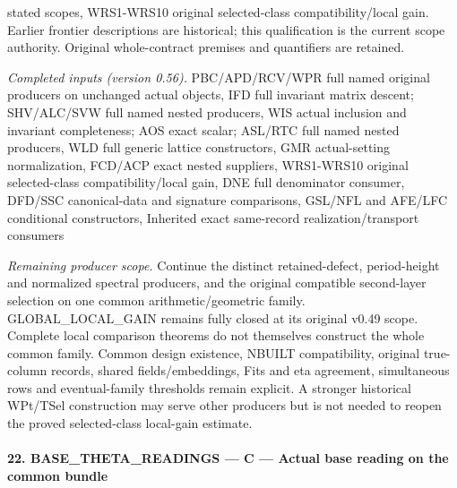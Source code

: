 \documentclass[11pt,a4paper]{article}
\numberwithin{equation}{section}
\theoremstyle{remark}\newtheorem{remark}[theorem]{Remark}
\begin{document}
stated scopes, WRS1-WRS10 original selected-class compatibility/local gain. Earlier frontier descriptions are historical; this qualification is the current scope authority. Original whole-contract premises and quantifiers are retained.

\emph{Completed inputs (version 0.56).} PBC/APD/RCV/WPR full named original producers on unchanged actual objects, IFD full invariant matrix descent; SHV/ALC/SVW full named nested producers, WIS actual inclusion and invariant completeness; AOS exact scalar; ASL/RTC full named nested producers, WLD full generic lattice constructors, GMR actual-setting normalization, FCD/ACP exact nested suppliers, WRS1-WRS10 original selected-class compatibility/local gain, DNE full denominator consumer, DFD/SSC canonical-data and signature comparisons, GSL/NFL and AFE/LFC conditional constructors, Inherited exact same-record realization/transport consumers

\emph{Remaining producer scope.} Continue the distinct retained-defect, period-height and normalized spectral producers, and the original compatible second-layer selection on one common arithmetic/geometric family. GLOBAL\_\allowbreak LOCAL\_\allowbreak GAIN remains fully closed at its original v0.49 scope. Complete local comparison theorems do not themselves construct the whole common family. Common design existence, NBUILT compatibility, original true-column records, shared fields/embeddings, Fits and eta agreement, simultaneous rows and eventual-family thresholds remain explicit. A stronger historical WPt/TSel construction may serve other producers but is not needed to reopen the proved selected-class local-gain estimate.



\paragraph{22. BASE\_\allowbreak THETA\_\allowbreak READINGS — C — Actual base reading on the common bundle}
\end{document}
